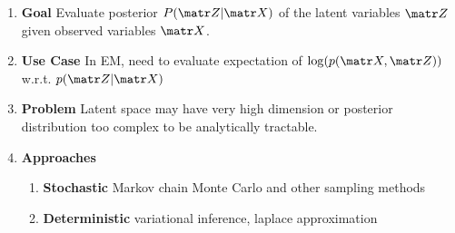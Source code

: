 \documentclass[11pt]{article}
\begin{document}
\begin{enumerate}
    \item \textbf{Goal} Evaluate posterior $P(\bZ | \bX)$ of the latent variables $\bZ$ given observed variables $\bX$.
    \item \textbf{Use Case} In EM, need to evaluate expectation of $\log(p(\bX, \bZ))$ w.r.t. $p(\bZ | \bX)$ 
    \item \textbf{Problem} Latent space may have very high dimension or posterior distribution too complex to be analytically tractable. 
    \item \textbf{Approaches} 
    \begin{enumerate}
        \item \textbf{Stochastic} Markov chain Monte Carlo and other sampling methods
        \item \textbf{Deterministic} variational inference, laplace approximation
    \end{enumerate}
\end{enumerate}


\end{document}

